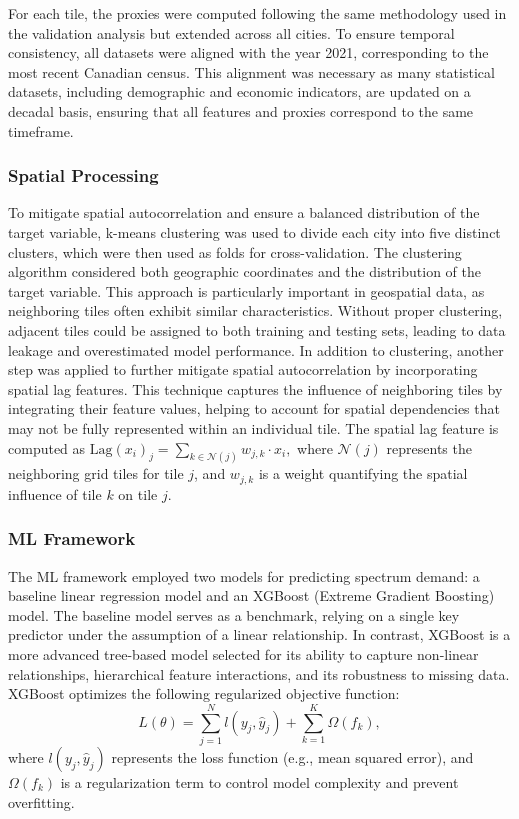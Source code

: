 \documentclass[conference]{IEEEtran}
\begin{document}
For each tile, the proxies were computed following the same methodology used in the validation analysis but extended across all cities. To ensure temporal consistency, all datasets were aligned with the year 2021, corresponding to the most recent Canadian census. This alignment was necessary as many statistical datasets, including demographic and economic indicators, are updated on a decadal basis, ensuring that all features and proxies correspond to the same timeframe.


\subsubsection{Spatial Processing}
To mitigate spatial autocorrelation and ensure a balanced distribution of the target variable, k-means clustering was used to divide each city into five distinct clusters, which were then used as folds for cross-validation. The clustering algorithm considered both geographic coordinates and the distribution of the target variable. This approach is particularly important in geospatial data, as neighboring tiles often exhibit similar characteristics. Without proper clustering, adjacent tiles could be assigned to both training and testing sets, leading to data leakage and overestimated model performance. In addition to clustering, another step was applied to further mitigate spatial autocorrelation by incorporating spatial lag features. This technique captures the influence of neighboring tiles by integrating their feature values, helping to account for spatial dependencies that may not be fully represented within an individual tile. The spatial lag feature is computed as $\text{Lag}(x_i)_j = \sum_{k \in \mathcal{N}(j)} w_{j,k} \cdot x_i,$ 
where \(\mathcal{N}(j)\) represents the neighboring grid tiles for tile \(j\), and \(w_{j,k}\) is a weight quantifying the spatial influence of tile \(k\) on tile \(j\).


\subsubsection{ML Framework}
The ML framework employed two models for predicting spectrum demand: a baseline linear regression model and an XGBoost (Extreme Gradient Boosting) model. The baseline model serves as a benchmark, relying on a single key predictor under the assumption of a linear relationship. In contrast, XGBoost is a more advanced tree-based model selected for its ability to capture non-linear relationships, hierarchical feature interactions, and its robustness to missing data. XGBoost optimizes the following regularized objective function:
\begin{equation}
L(\theta) = \sum_{j=1}^{N} l(y_j, \hat{y}_j) + \sum_{k=1}^{K} \Omega(f_k),
\end{equation}
where \( l(y_j, \hat{y}_j) \) represents the loss function (e.g., mean squared error), and \( \Omega(f_k) \) is a regularization term to control model complexity and prevent overfitting.
\end{document}
